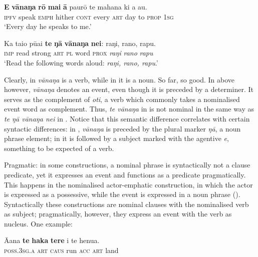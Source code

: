 \ea\label{ex:3.9}
\gll \textbf{E} \textbf{vānaŋa} \textbf{rō} \textbf{mai} \textbf{{\ꞌ}ā} paurō te mahana ki a au.\\
\textsc{ipfv} speak \textsc{emph} hither \textsc{cont} every \textsc{art} day to \textsc{prop} \textsc{1sg}\\

\glt 
‘Every day he speaks to me.’ \textstyleExampleref{[R655.018]} 
\z

\ea\label{ex:3.10}
\gll Ka tai{\ꞌ}o pūai \textbf{te} \textbf{ŋā} \textbf{vānaŋa} \textbf{nei}: raŋi, rano, rapu.\\
\textsc{imp} read strong \textsc{art} \textsc{pl} word \textsc{prox} \textit{raŋi} \textit{rano} \textit{rapu}\\

\glt
‘Read the following words aloud: \textit{raŋi, rano, rapu}.’ \textstyleExampleref{[R616.147]} 
\z

Clearly, in  \textit{vānaŋa} is a verb, while in  it is a noun. So far, so good. In  above however, \textit{vānaŋa} denotes an event, even though it is preceded by a determiner. It serves as the complement of \textit{oti}, a verb which commonly takes a nominalised event word as complement. Thus, \textit{te vānaŋa} in  is not nominal in the same way as \textit{te ŋā vānaŋa nei} in . Notice that this semantic difference correlates with certain syntactic differences: in , \textit{vānaŋa} is preceded by the plural marker \textit{ŋā}, a noun phrase element; in  it is followed by a subject marked with the agentive \textit{e}, something to be expected of a verb. 

Pragmatic: in some constructions, a nominal phrase is syntactically not a clause predicate, yet it expresses an event and functions as a predicate pragmatically. This happens in the nominalised actor-emphatic construction, in which the actor is expressed as a possessive, while the event is expressed in a noun phrase (). Syntactically these constructions are nominal clauses with the nominalised verb as subject; pragmatically, however, they express an event with the verb as nucleus. One example:

\ea\label{ex:3.11}
\gll {\ꞌ}Ā{\ꞌ}ana \textbf{te} \textbf{haka} \textbf{tere} i te henua.\\
\textsc{poss.3sg.a} \textsc{art} \textsc{caus} run \textsc{acc} \textsc{art} land\\

